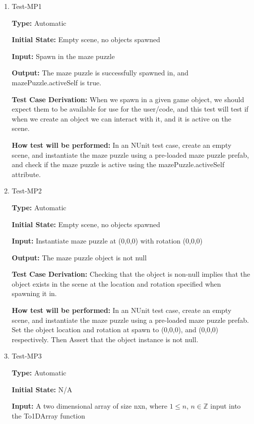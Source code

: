 \documentclass[12pt, titlepage]{article}
\begin{document}
 \begin{enumerate}

 \item{Test-MP1\\}

 \textbf{Type:} Automatic
					
 \textbf{Initial State:} Empty scene, no objects spawned
					
 \textbf{Input:} Spawn in the maze puzzle
					
 \textbf{Output:} The maze puzzle is successfully spawned in, and mazePuzzle.activeSelf is true. 

 \textbf{Test Case Derivation:} When we spawn in a given game object, we should expect them to be available for use for the user/code, and this test will test if when we create an object we can interact with it, and it is active on the scene.

 \textbf{How test will be performed:} In an NUnit test case, create an empty scene, and instantiate the maze puzzle using a pre-loaded maze puzzle prefab, and check if the maze puzzle is active using the mazePuzzle.activeSelf attribute. 
					
 \item{Test-MP2\\}

 \textbf{Type:} Automatic
					
 \textbf{Initial State:} Empty scene, no objects spawned
					
 \textbf{Input:} Instantiate maze puzzle at (0,0,0) with rotation (0,0,0)
					
 \textbf{Output:} The maze puzzle object is not null

 \textbf{Test Case Derivation:} Checking that the object is non-null implies that the object exists in the scene at the location and rotation specified when spawning it in. 

 \textbf{How test will be performed:} In an NUnit test case, create an empty scene, and instantiate the maze puzzle using a pre-loaded maze puzzle prefab. Set the object location and rotation at spawn to (0,0,0), and (0,0,0) respectively. Then Assert that the object instance is not null.

 \item{Test-MP3\\}

 \textbf{Type:} Automatic
					
 \textbf{Initial State:} N/A
					
 \textbf{Input:}  A two dimensional array of size nxn, where $1\leq n$, $n\in \mathbb{Z}$ input into the To1DArray function
					

\end{enumerate}
\end{document}
